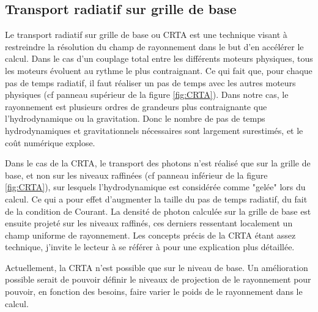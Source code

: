 \subsection{Transport radiatif sur grille de base}
\label{sec:crta}

Le transport radiatif sur grille de base ou \ac{CRTA} est une technique visant à restreindre la résolution du champ de rayonnement dans le but d'en accélérer le calcul.
Dans le cas d'un couplage total entre les différents moteurs physiques, tous les moteurs évoluent au rythme le plus contraignant.
Ce qui fait que, pour chaque pas de temps radiatif, il faut réaliser un pas de temps avec les autres moteurs physiques (cf panneau supérieur de la figure \ref{fig:CRTA}).
Dans notre cas, le rayonnement est plusieurs ordres de grandeurs plus contraignante que l'hydrodynamique ou la gravitation.
Donc le nombre de pas de temps hydrodynamiques et gravitationnels nécessaires sont largement surestimés, et le coût numérique explose.

Dans le cas de la \ac{CRTA}, le transport des photons n'est réalisé que sur la grille de base, et non sur les niveaux raffinées (cf panneau inférieur de la figure \ref{fig:CRTA}), sur lesquels l'hydrodynamique est considérée comme "gelée" lors du calcul.
Ce qui a pour effet d'augmenter la taille du pas de temps radiatif, du fait de la condition de Courant.
La densité de photon calculée sur la grille de base est ensuite projeté sur les niveaux raffinés, ces derniers ressentant localement un champ uniforme de rayonnement.
Les concepts précis de la \ac{CRTA} étant assez technique, j'invite le lecteur à se référer à \cite{aubert_emma:_2015} pour une explication plus détaillée.

Actuellement, la \ac{CRTA} n'est possible que sur le niveau de base.
Un amélioration possible serait de pouvoir définir le niveaux de projection de le rayonnement pour pouvoir, en fonction des besoins, faire varier le poids de le rayonnement dans le calcul.


